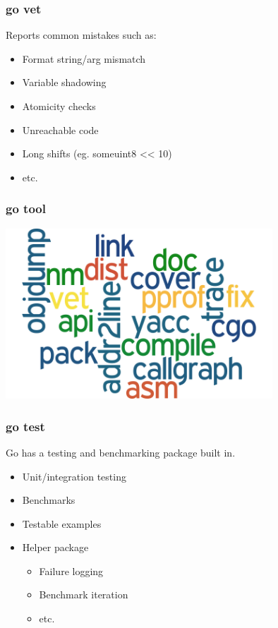 \documentclass[xelatex,aspectratio=169]{beamer}
\begin{document}
\begin{frame}
	\frametitle{go vet}
	\begin{flushleft}
		Reports common mistakes such as:
	\end{flushleft}
	\begin{itemize}[<+(1)->]
		\item Format string/arg mismatch
		\item Variable shadowing
		\item Atomicity checks
		\item Unreachable code
		\item Long shifts (eg. someuint8 << 10)
		\item etc.
	\end{itemize}
\end{frame}

\begin{frame}
	\frametitle{go tool}
	\centerline{\includegraphics[width=0.75\textwidth]{images/tools.png}}
\end{frame}

\begin{frame}
	\frametitle{go test}
	\begin{flushleft}
		Go has a testing and benchmarking package built in.
	\end{flushleft}
	\begin{flushleft}
	\begin{itemize}[<+(1)->]
			\item Unit/integration testing
			\item Benchmarks
			\item Testable examples
			\item Helper package
			\begin{itemize}[<+(1)->]
				\item Failure logging
				\item Benchmark iteration
				\item etc.
			\end{itemize}
	\end{itemize}
	\end{flushleft}
\end{frame}
\end{document}
